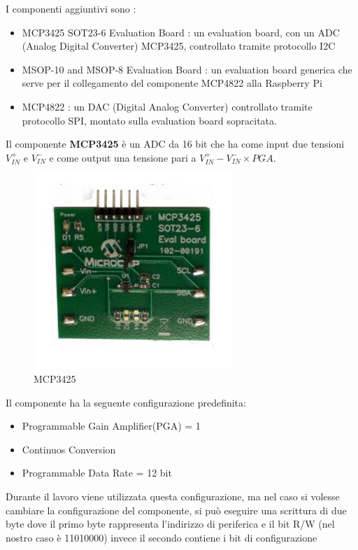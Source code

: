 \documentclass[12pt, a4paper, titlepage, oneside]{book}
\begin{document}
\begin{flushleft}
I componenti aggiuntivi sono :
\begin{itemize}
    \item MCP3425 SOT23-6 Evaluation Board  \cite{microchipMCP3425}: un evaluation board, con un ADC (Analog Digital Converter) MCP3425, controllato tramite protocollo I2C
    \item MSOP-10 and MSOP-8 Evaluation Board \cite{microchipMSOP10-8}: un evaluation board generica che serve per il collegamento del componente MCP4822 alla Raspberry Pi
    \item MCP4822 \cite{microchipMCP4822}: un DAC (Digital Analog Converter) controllato tramite protocollo SPI, montato sulla evaluation board sopracitata.
\end{itemize}
\newpage
Il componente \textbf{MCP3425} è un ADC da 16 bit che ha come input due tensioni $V_{IN}^+ $ e $ V_{IN}^-$ e come output una tensione pari a $V_{IN}^+ - V_{IN}^- \times PGA$.\\ 
\begin{figure}[h]
    \centering
    \includegraphics{MCP3425.JPG}
    \caption{MCP3425}
    \label{fig:MCP3425}
\end{figure}
Il componente ha la seguente configurazione predefinita:
\begin{itemize}
    \item Programmable Gain Amplifier(PGA) = 1
    \item Continuos Conversion
    \item Programmable Data Rate = 12 bit
\end{itemize}
Durante il lavoro viene utilizzata questa configurazione, ma nel caso si volesse cambiare la configurazione del componente, si può eseguire una scrittura di due byte dove il primo byte rappresenta l'indirizzo di periferica e il bit R/W (nel nostro caso è 11010000) invece il secondo contiene i bit di configurazione\\

\end{flushleft}
\end{document}
